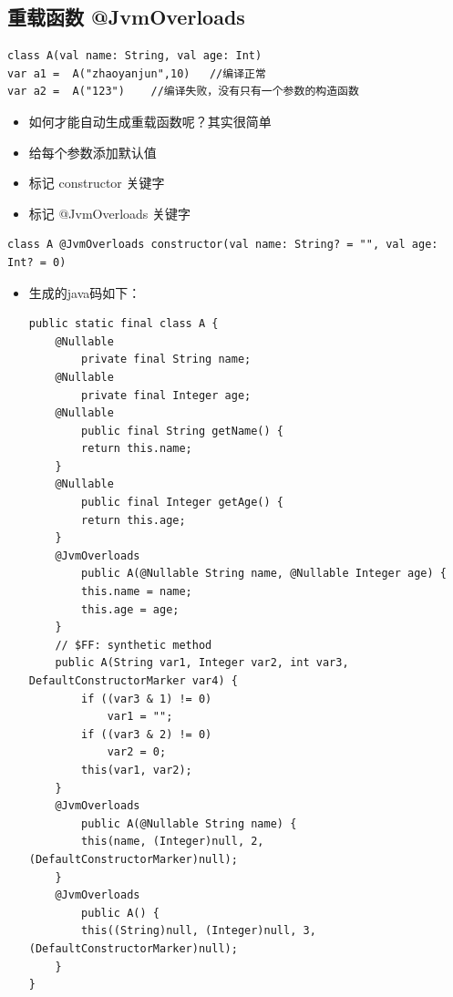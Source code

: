 \documentclass[9pt, b5paper]{article}
\begin{document}
\subsection{重载函数 @JvmOverloads}
\label{sec-6-6}
\begin{verbatim}
class A(val name: String, val age: Int)
var a1 =  A("zhaoyanjun",10)   //编译正常
var a2 =  A("123")    //编译失败，没有只有一个参数的构造函数
\end{verbatim}
\begin{itemize}
\item 如何才能自动生成重载函数呢？其实很简单
\item 给每个参数添加默认值
\item 标记 constructor 关键字
\item 标记 @JvmOverloads 关键字
\end{itemize}
\begin{verbatim}
class A @JvmOverloads constructor(val name: String? = "", val age: Int? = 0)
\end{verbatim}
\begin{itemize}
\item 生成的java码如下：
\begin{verbatim}
public static final class A {
    @Nullable
        private final String name;
    @Nullable
        private final Integer age;
    @Nullable
        public final String getName() {
        return this.name;
    }
    @Nullable
        public final Integer getAge() {
        return this.age;
    }
    @JvmOverloads
        public A(@Nullable String name, @Nullable Integer age) {
        this.name = name;
        this.age = age;
    }
    // $FF: synthetic method
    public A(String var1, Integer var2, int var3, DefaultConstructorMarker var4) {
        if ((var3 & 1) != 0) 
            var1 = "";
        if ((var3 & 2) != 0) 
            var2 = 0;
        this(var1, var2);
    }
    @JvmOverloads
        public A(@Nullable String name) {
        this(name, (Integer)null, 2, (DefaultConstructorMarker)null);
    }
    @JvmOverloads
        public A() {
        this((String)null, (Integer)null, 3, (DefaultConstructorMarker)null);
    }
}
\end{verbatim}
\end{itemize}
\end{document}
